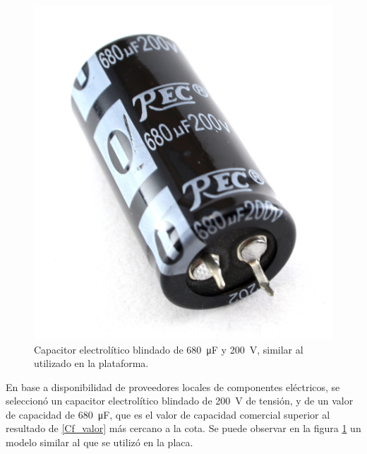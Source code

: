 \begin{figure}[h]
    \centering
    \includegraphics[scale=0.20]{Imagenes/Capacitor Blindado.jpg}
    \caption{Capacitor electrolítico blindado de \SI{680}{\micro\farad} y \SI{200}{\volt}, similar al utilizado en la plataforma.}
    \label{Cf_blindado}
\end{figure}

En base a disponibilidad de proveedores locales de componentes eléctricos, se seleccionó un capacitor electrolítico blindado de \SI{200}{\volt} de tensión, y de un valor de capacidad de \SI{680}{\micro\farad}, que es el valor de capacidad comercial superior al resultado de \ref{Cf_valor} más cercano a la cota. Se puede observar en la figura \ref{Cf_blindado} un modelo similar al que se utilizó en la placa.\\